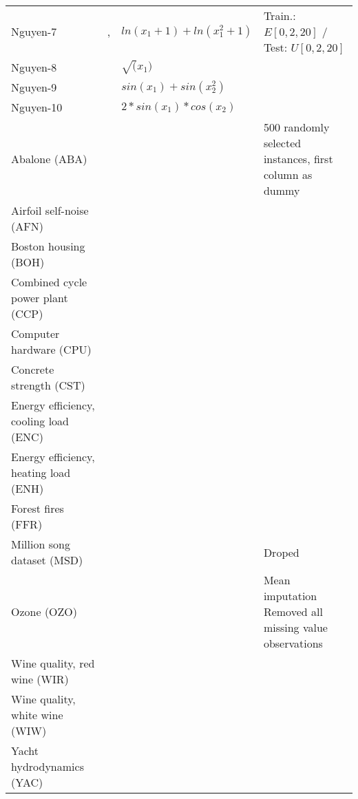 \begin{table*}[htbp]
\begin{center}
\begin{tabular}{llll}
Nguyen-7 & \cite{krawiec2013approximating},\cite{worm2013prioritized,wieloch2013running,harada2014asynchronously,krawiec2014behavioral,demelo2014kaizen,lacava2015genetic,liskowski2017discovery} & $ln(x_1+1)+ln(x_1^2+1)$ & Train.: $E[0,2,20]$ / Test: $U[0,2,20]$ \\ 
Nguyen-8 & \cite{worm2013prioritized,wieloch2013running,demelo2014kaizen,liskowski2017discovery} & $\sqrt(x_1)$ &  \\ 
Nguyen-9 & \cite{worm2013prioritized,wieloch2013running,krawiec2014behavioral,demelo2014kaizen,liskowski2017discovery} & $sin(x_1)+sin(x_2^2)$ &  \\ 
Nguyen-10 & \cite{worm2013prioritized,wieloch2013running,krawiec2014behavioral,demelo2014kaizen} & $2*sin(x_1)*cos(x_2)$ &  \\ 
Abalone (ABA) & \cite{thuong2017combining} &  & 500 randomly selected instances, first column as dummy \\ 
Airfoil self-noise (AFN) & \cite{oliveira2016dispersion} & &  \\ 
Boston housing (BOH) & \cite{whigham2015examining,dick2015reexamination,lacava2016epsilon,thuong2017combining} &  &  \\ 
Combined cycle power plant (CCP) & \cite{medernach2016new} & &  \\ 
Computer hardware (CPU) & \cite{oliveira2016dispersion} &  &  \\ 
Concrete strength (CST) & \cite{medernach2016new,oliveira2016dispersion} &  &  \\ 
Energy efficiency, cooling load (ENC) & \cite{arnaldo2014multiple,arnaldo2015building,lacava2016epsilon,oliveira2016dispersion} & &  \\ 
Energy efficiency, heating load (ENH) & \cite{arnaldo2014multiple,arnaldo2015building,lacava2016epsilon,oliveira2016dispersion} &  & \\ 
Forest fires (FFR) & \cite{oliveira2016dispersion} & &  \\ 
Million song dataset (MSD) & \cite{arnaldo2015building} & & Droped \\ 
Ozone (OZO) & \cite{thuong2017combining} &  & Mean imputation
 Removed all missing value observations \\ 
Wine quality, red wine (WIR) & \cite{arnaldo2014multiple,arnaldo2015building,oliveira2016dispersion} &  &  \\ 
Wine quality, white wine (WIW) & \cite{arnaldo2014multiple,arnaldo2015building,oliveira2016dispersion} &  &  \\ 
Yacht hydrodynamics (YAC) & \cite{medernach2016new} &  &  \\ 
\end{tabular}
\end{center}
\label{tab:datasets}
\end{table*}

